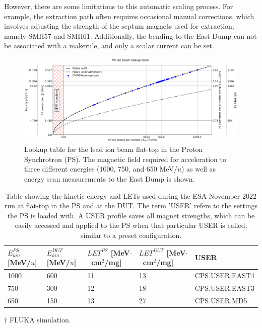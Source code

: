 \documentclass{cernatsnote}
\begin{document}
However, there are some limitations to this automatic scaling process. For example, the extraction path often requires occasional manual corrections, which involves adjusting the strength of the septum magnets used for extraction, namely SMH57 and SMH61. Additionally, the bending to the East Dump can not be associated with a makerule, and only a scalar current can be set.
\\

\begin{figure}[!htb]
\centering
\includegraphics[width=1.0\textwidth]{images/PS_BEAM_ENERGY/kinetic_energy_lookup_chimera.png}
\caption{Lookup table for the lead ion beam flat-top in the Proton Synchrotron (PS). The magnetic field required for acceleration to three different energies (1000, 750, and 650 MeV/$u$) as well as energy scan measurements to the East Dump is shown.}
\label{fig:lookup table}
\end{figure}

\begin{table}[!htbp]
\centering
\begin{threeparttable}
\label{tab:KE_table}
\begin{tabular}{@{}m{1.6cm}m{1.6cm}m{2.8cm}m{2.8cm}m{4cm}@{}}
\toprule
$E^{PS}_{kin}$ {[}MeV/$u${]} & $E^{DUT}_{kin}$\tnote{$\dagger$} [MeV/$u$] & $LET^{PS}$\tnote{$\dagger$} [MeV$\cdot$~cm$^2$/mg] & $LET^{DUT}$\tnote{$\dagger$} [MeV$\cdot$~cm$^2$/mg] & USER \\ \midrule
1000 & 600 & 11 & 13 & CPS.USER.EAST4 \\
750 & 300 & 12 & 18 & CPS.USER.EAST3 \\
650 & 150 & 13 & 27 & CPS.USER.MD5 \\ \bottomrule
\end{tabular}
\begin{tablenotes}
\item[$\dagger$] FLUKA simulation.
\end{tablenotes}
\caption{Table showing the kinetic energy and LETs used during the ESA November 2022 run at flat-top in the PS and at the DUT. The term 'USER' refers to the settings the PS is loaded with. A USER profile saves all magnet strengths, which can be easily accessed and applied to the PS when that particular USER is called, similar to a preset configuration.}
\end{threeparttable}
\end{table}
\end{document}

